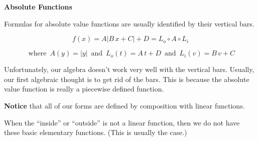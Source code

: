 \documentclass{ximera}
\begin{document}
\begin{template}  \textbf{\textcolor{blue!55!black}{Absolute Functions}} 



Formulas for absolute value functions are usually identified by their vertical bars.





\[ f(x) = A | B \, x + C | + D = L_o \circ A \circ L_i\]

\[
\text{ where } \,  A(y) = | y |  \,  \text{ and } \,    L_o(t) = A \, t + D    \,  \text{ and } \,   L_i(v) = B \, v + C
\]







\end{template}






Unfortunately, our algebra doesn't work very well with the vertical bars.  Usually, our first algebraic thought is to get rid of the bars.  This is because the absolute value function is really a piecewise defined function.   



\textbf{Notice} that all of our forms are defined by composition with linear functions.  

When the ``inside'' or ``outside'' is not a linear function, then we do not have these basic elementary functions. (This is usually the case.)
\end{document}
